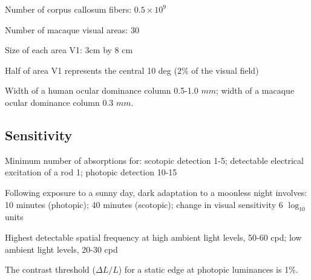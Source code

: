 
\item Number of corpus callosum fibers:  $0.5 \times 10^{9}$

\item Number of macaque visual areas:  30

\item Size of each area V1: 3cm by 8 cm

\item Half of area V1 represents the central 10 deg (2\% of the
visual field)

\item Width of a human ocular dominance column 0.5-1.0 $mm$; width of
a macaque ocular dominance column 0.3 $mm$.

\ee

\subsection*{Sensitivity}

\be

\item Minimum number of absorptions for: scotopic detection 1-5;
detectable electrical excitation of a rod 1; photopic detection 10-15

\item Following exposure to a sunny day, dark adaptation to a
moonless night involves: 10 minutes (photopic); 40 minutes (scotopic);
change in visual sensitivity 6 $\log_{10}$ units

\item Highest detectable spatial frequency at high ambient light levels,
50-60 cpd; low ambient light levels, 20-30 cpd

\item The contrast threshold ($\Delta L / L$) for a static edge at photopic
luminances is 1\%.  

